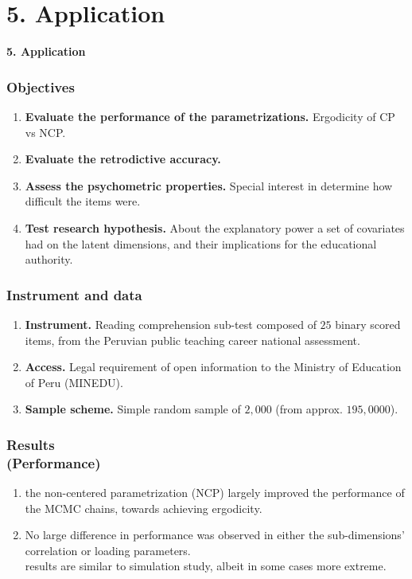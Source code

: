 \documentclass[arial,12pt,xcolor=dvipsnames]{beamer}
\begin{document}
\section{5. Application}
%
\begin{frame}
	\textbf{5. Application}
\end{frame}
%
\begin{frame}
	\frametitle{Objectives}
	\begin{enumerate}
		\item \textbf{Evaluate the performance of the parametrizations.} Ergodicity of CP vs NCP.
		\item \textbf{Evaluate the retrodictive accuracy.}
		\item \textbf{Assess the psychometric properties.} Special interest in determine how difficult the items were.
		\item \textbf{Test research hypothesis.} About the explanatory power a set of covariates had on the latent dimensions, and their implications for the educational authority.
	\end{enumerate}
\end{frame}
%
\begin{frame}
	\frametitle{Instrument and data}
	\begin{enumerate}
		\item \textbf{Instrument.} Reading comprehension sub-test composed of $25$ binary scored items, from the Peruvian public teaching career national assessment.
		\item \textbf{Access.} Legal requirement of open information to
		the Ministry of Education of Peru (MINEDU).
		\item \textbf{Sample scheme.} Simple random sample of $2,000$ (from approx. $195,0000$).
	\end{enumerate} 
\end{frame}
%
\begin{frame}
	\frametitle{Results \\
		(Performance)}
	\begin{enumerate}
		\item the non-centered parametrization (NCP) largely
		improved the performance of the MCMC chains, towards achieving ergodicity.
		\item No large difference in performance was observed in either the sub-dimensions’ correlation or loading parameters.\\
		\vspace{0.3cm} results are similar to simulation study, albeit in some cases more extreme.
	\end{enumerate} 
\end{frame}
\end{document}
